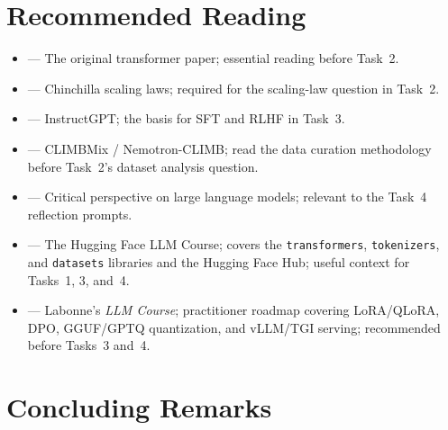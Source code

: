 \section{Recommended Reading}
\label{sec:reading}

\begin{itemize}
    \item \citet{vaswani2017attention} --- The original transformer paper; essential reading before Task~2.
    \item \citet{10.5555/3600270.3602446} --- Chinchilla scaling laws; required for the scaling-law question in Task~2.
    \item \citet{ouyang2022training} --- InstructGPT; the basis for SFT and RLHF in Task~3.
    \item \citet{diao2026nemotron} --- CLIMBMix / Nemotron-CLIMB; read the data curation methodology before Task~2's dataset analysis question.
    \item \citet{bender2021dangers} --- Critical perspective on large language models; relevant to the Task~4 reflection prompts.
    \item \citet{huggingface2022course} --- The Hugging Face LLM Course; covers the \texttt{transformers}, \texttt{tokenizers}, and \texttt{datasets} libraries and the Hugging Face Hub; useful context for Tasks~1, 3, and~4.
    \item \citet{labonne2023llmcourse} --- Labonne's \textit{LLM Course}; practitioner roadmap covering LoRA/QLoRA, DPO, GGUF/GPTQ quantization, and vLLM/TGI serving; recommended before Tasks~3 and~4.
\end{itemize}



\section{Concluding Remarks}
\label{sec:conclusion}

